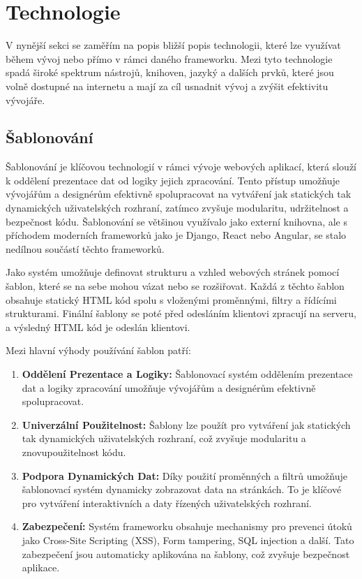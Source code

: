 \section{Technologie}
\label{sec:dev-technology}
V nynější sekci se zaměřím na popis bližší popis technologii, které lze využívat během vývoj nebo přímo v rámci daného frameworku. Mezi tyto technologie spadá široké spektrum nástrojů, knihoven, jazyký a dalších prvků, které jsou volně dostupné na internetu a mají za cíl usnadnit vývoj a zvýšit efektivitu vývojáře.

\subsection{Šablonování}
\label{subsec:dev-technology-templating}
Šablonování je klíčovou technologií v rámci vývoje webových aplikací, která slouží k oddělení prezentace dat od logiky jejich zpracování. Tento přístup umožňuje vývojářům a designérům efektivně spolupracovat na vytváření jak statických tak dynamických uživatelských rozhraní, zatímco zvyšuje modularitu, udržitelnost a bezpečnost kódu. Šablonování se většinou využívalo jako externí knihovna, ale s příchodem moderních frameworků jako je Django, React nebo Angular, se stalo nedílnou součástí těchto frameworků.

Jako systém umožňuje definovat strukturu a vzhled webových stránek pomocí šablon, které se na sebe mohou vázat nebo se rozšiřovat. Každá z těchto šablon obsahuje statický HTML kód spolu s vloženými proměnnými, filtry a řídícími strukturami. Finální šablony se poté před odesláním klientovi zpracují na serveru, a výsledný HTML kód je odeslán klientovi.

Mezi hlavní výhody používání šablon patří:
\begin{enumerate}
    \item \textbf{Oddělení Prezentace a Logiky:} Šablonovací systém oddělením prezentace dat a logiky zpracování umožňuje vývojářům a designérům efektivně spolupracovat.
    \item \textbf{Univerzální Použitelnost:} Šablony lze použít pro vytváření jak statických tak dynamických uživatelských rozhraní, což zvyšuje modularitu a znovupoužitelnost kódu.
    \item \textbf{Podpora Dynamických Dat:} Díky použití proměnných a filtrů umožňuje šablonovací systém dynamicky zobrazovat data na stránkách. To je klíčové pro vytváření interaktivních a daty řízených uživatelských rozhraní.
    \item \textbf{Zabezpečení:} Systém frameworku obsahuje mechanismy pro prevenci útoků jako Cross-Site Scripting (XSS), Form tampering, SQL injection a další. Tato zabezpečení jsou automaticky aplikována na šablony, což zvyšuje bezpečnost aplikace.
\end{enumerate}

